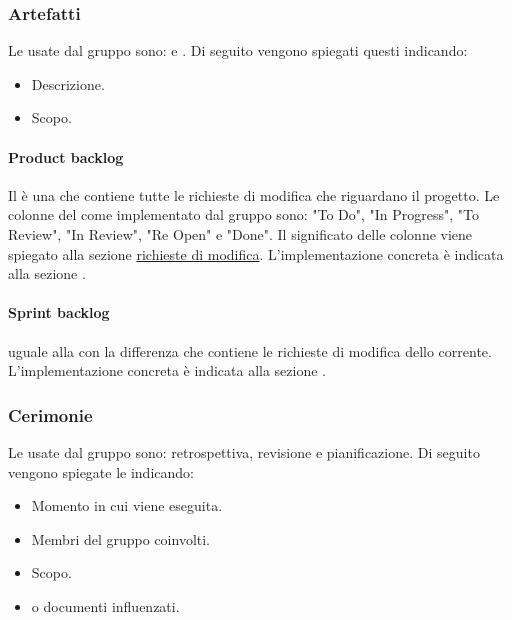 \subsubsection{Artefatti}
Le  usate dal gruppo sono:  e . 
Di seguito vengono spiegati questi  indicando:
\begin{itemize}
    \item Descrizione.
    \item Scopo.
\end{itemize}

\paragraph{Product backlog}
Il  è una  che contiene tutte le richieste di modifica che riguardano il progetto.
Le colonne del  come implementato dal gruppo sono: "To Do", "In Progress", "To Review", "In Review", "Re Open" e "Done".
Il significato delle colonne viene spiegato alla sezione \hyperref[par:ciclo_vita_richieste_di_modifica]{ richieste di modifica}.
L'implementazione concreta è indicata alla sezione \hyperref[subpar:project]{}.

\paragraph{Sprint backlog}
 uguale alla  con la differenza che contiene le richieste di modifica dello  corrente.
L'implementazione concreta è indicata alla sezione \hyperref[subpar:project]{}.

\subsubsection{Cerimonie}
Le  usate dal gruppo sono: retrospettiva, revisione e pianificazione. 
Di seguito vengono spiegate le  indicando:
\begin{itemize}
    \item Momento in cui viene eseguita.
    \item Membri del gruppo coinvolti.
    \item Scopo.
    \item {} o documenti influenzati.
\end{itemize}

